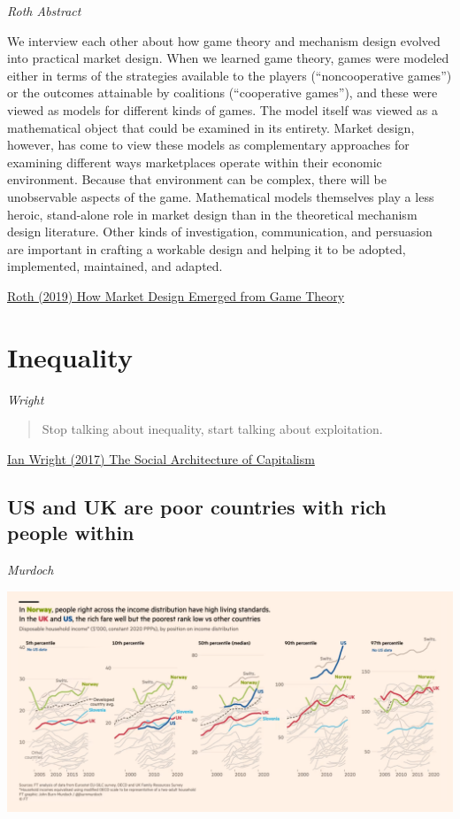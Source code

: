 \documentclass[
]{book}
\begin{document}
\emph{Roth Abstract}

We interview each other about how game theory and mechanism design evolved into practical market design. When we learned game theory, games were modeled either in terms of the strategies available to the players (``noncooperative games'') or the outcomes attainable by coalitions (``cooperative games''), and these were viewed as models for different kinds of games. The model itself was viewed as a mathematical object that could be examined in its entirety. Market design, however, has come to view these models as complementary approaches for examining different ways marketplaces operate within their economic environment. Because that environment can be complex, there will be unobservable aspects of the game. Mathematical models themselves play a less heroic, stand-alone role in market design than in the theoretical mechanism design literature. Other kinds of investigation, communication, and persuasion are important in crafting a workable design and helping it to be adopted, implemented, maintained, and adapted.

\href{https://www.aeaweb.org/articles?id=10.1257/jep.33.3.118}{Roth (2019) How Market Design Emerged from Game Theory}

\hypertarget{inequality}{%
\chapter{Inequality}\label{inequality}}

\emph{Wright}

\begin{quote}
Stop talking about inequality, start talking about exploitation.
\end{quote}

\href{https://ianwrightsite.wordpress.com/2017/11/16/the-social-architecture-of-capitalism/}{Ian Wright (2017) The Social Architecture of Capitalism}

\hypertarget{us-and-uk-are-poor-countries-with-rich-people-within}{%
\section{US and UK are poor countries with rich people within}\label{us-and-uk-are-poor-countries-with-rich-people-within}}

\emph{Murdoch}

\includegraphics{fig/US_UK_Poor_Countries_with_Rich_People.png}
\end{document}
